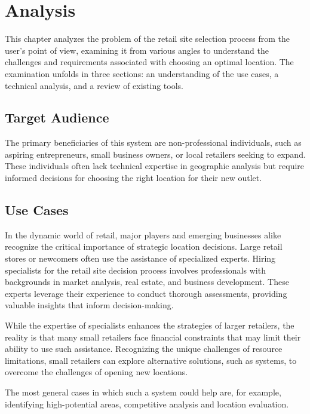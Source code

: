 \chapter{Analysis}
\label{ch:4}

This chapter analyzes the problem of the retail site selection process from the user's point of view, examining it from various angles to understand the challenges and requirements associated with choosing an optimal location. The examination unfolds in three sections: an understanding of the use cases, a technical analysis, and a review of existing tools.

\section{Target Audience}
\label{section:target-audience}

The primary beneficiaries of this system are non-professional individuals, such as aspiring entrepreneurs, small business owners, or local retailers seeking to expand. These individuals often lack technical expertise in geographic analysis but require informed decisions for choosing the right location for their new outlet.

\section{Use Cases}

In the dynamic world of retail, major players and emerging businesses alike recognize the critical importance of strategic location decisions. Large retail stores or newcomers often use the assistance of specialized experts. Hiring specialists for the retail site decision process involves professionals with backgrounds in market analysis, real estate, and business development. These experts leverage their experience to conduct thorough assessments, providing valuable insights that inform decision-making. 

While the expertise of specialists enhances the strategies of larger retailers, the reality is that many small retailers face financial constraints that may limit their ability to use such assistance. Recognizing the unique challenges of resource limitations, small retailers can explore alternative solutions, such as systems, to overcome the challenges of opening new locations.

The most general cases in which such a system could help are, for example, identifying high-potential areas, competitive analysis and location evaluation.

